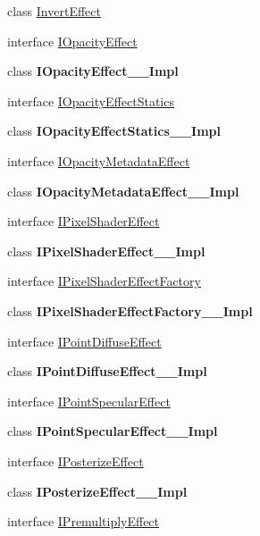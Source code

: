 \begin{DoxyCompactItemize}
class \hyperlink{class_microsoft_1_1_graphics_1_1_canvas_1_1_effects_1_1_invert_effect}{Invert\+Effect}
\item 
interface \hyperlink{interface_microsoft_1_1_graphics_1_1_canvas_1_1_effects_1_1_i_opacity_effect}{I\+Opacity\+Effect}
\item 
class {\bfseries I\+Opacity\+Effect\+\_\+\+\_\+\+Impl}
\item 
interface \hyperlink{interface_microsoft_1_1_graphics_1_1_canvas_1_1_effects_1_1_i_opacity_effect_statics}{I\+Opacity\+Effect\+Statics}
\item 
class {\bfseries I\+Opacity\+Effect\+Statics\+\_\+\+\_\+\+Impl}
\item 
interface \hyperlink{interface_microsoft_1_1_graphics_1_1_canvas_1_1_effects_1_1_i_opacity_metadata_effect}{I\+Opacity\+Metadata\+Effect}
\item 
class {\bfseries I\+Opacity\+Metadata\+Effect\+\_\+\+\_\+\+Impl}
\item 
interface \hyperlink{interface_microsoft_1_1_graphics_1_1_canvas_1_1_effects_1_1_i_pixel_shader_effect}{I\+Pixel\+Shader\+Effect}
\item 
class {\bfseries I\+Pixel\+Shader\+Effect\+\_\+\+\_\+\+Impl}
\item 
interface \hyperlink{interface_microsoft_1_1_graphics_1_1_canvas_1_1_effects_1_1_i_pixel_shader_effect_factory}{I\+Pixel\+Shader\+Effect\+Factory}
\item 
class {\bfseries I\+Pixel\+Shader\+Effect\+Factory\+\_\+\+\_\+\+Impl}
\item 
interface \hyperlink{interface_microsoft_1_1_graphics_1_1_canvas_1_1_effects_1_1_i_point_diffuse_effect}{I\+Point\+Diffuse\+Effect}
\item 
class {\bfseries I\+Point\+Diffuse\+Effect\+\_\+\+\_\+\+Impl}
\item 
interface \hyperlink{interface_microsoft_1_1_graphics_1_1_canvas_1_1_effects_1_1_i_point_specular_effect}{I\+Point\+Specular\+Effect}
\item 
class {\bfseries I\+Point\+Specular\+Effect\+\_\+\+\_\+\+Impl}
\item 
interface \hyperlink{interface_microsoft_1_1_graphics_1_1_canvas_1_1_effects_1_1_i_posterize_effect}{I\+Posterize\+Effect}
\item 
class {\bfseries I\+Posterize\+Effect\+\_\+\+\_\+\+Impl}
\item 
interface \hyperlink{interface_microsoft_1_1_graphics_1_1_canvas_1_1_effects_1_1_i_premultiply_effect}{I\+Premultiply\+Effect}
\item 

\end{DoxyCompactItemize}
